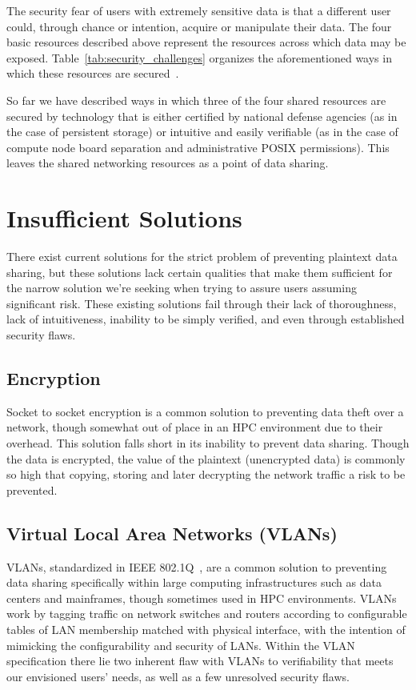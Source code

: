\documentclass[oneside,12pt]{memoir}
\begin{document}
The security fear of users with extremely sensitive data is that a different user could, through chance or intention, acquire or manipulate their data. The four basic resources described above represent the resources across which data may be exposed. Table~\ref{tab:security_challenges} organizes the aforementioned ways in which these resources are secured~\cite{buyya1999high}. 

So far we have described ways in which three of the four shared resources are secured by technology that is either certified by national defense agencies (as in the case of persistent storage) or intuitive and easily verifiable (as in the case of compute node board separation and administrative POSIX permissions). This leaves the shared networking resources as a point of data sharing. 

\section{Insufficient Solutions}
\label{sec:insufficient_solutions}
There exist current solutions for the strict problem of preventing plaintext data sharing, but these solutions lack certain qualities that make them sufficient for the narrow solution we're seeking when trying to assure users assuming significant risk. These existing solutions fail through their lack of thoroughness, lack of intuitiveness, inability to be simply verified, and even through established security flaws. 
\subsection{Encryption}
Socket to socket encryption is a common solution to preventing data theft over a network, though somewhat out of place in an HPC environment due to their overhead. This solution falls short in its inability to prevent data sharing. Though the data is encrypted, the value of the plaintext (unencrypted data) is commonly so high that copying, storing and later decrypting the network traffic a risk to be prevented.
\subsection{Virtual Local Area Networks (VLANs)}
VLANs, standardized in IEEE 802.1Q~\cite{ieee_vlan}, are a common solution to preventing data sharing specifically within large computing infrastructures such as data centers and mainframes, though sometimes used in HPC environments. VLANs work by tagging traffic on network switches and routers according to configurable tables of LAN membership matched with physical interface, with the intention of mimicking the configurability and security of LANs. Within the VLAN specification there lie two inherent flaw with VLANs to verifiability that meets our envisioned users' needs, as well as a few unresolved security flaws. 
\end{document}
